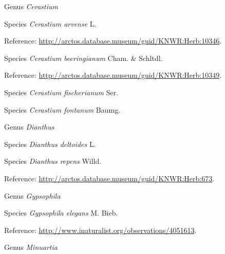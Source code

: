 \documentclass[9pt, article]{memoir}
\begin{document}
\begin{multicols}{2}
\vspace{6pt}\noindent\hspace{30pt}Genus \textit{Cerastium}


\vspace{6pt}\noindent\hspace{36pt}Species \textit{Cerastium arvense} L.


\vspace{6pt}Reference: 
\url{http://arctos.database.museum/guid/KNWR:Herb:10346}.

\vspace{6pt}\noindent\hspace{36pt}Species \textit{Cerastium beeringianum} Cham. \& Schltdl.


\vspace{6pt}Reference: 
\url{http://arctos.database.museum/guid/KNWR:Herb:10349}.

\vspace{6pt}\noindent\hspace{36pt}Species \textit{Cerastium fischerianum} Ser.


\vspace{6pt}\noindent\hspace{36pt}Species \textit{Cerastium fontanum} Baumg.


\vspace{6pt}\noindent\hspace{30pt}Genus \textit{Dianthus}


\vspace{6pt}\noindent\hspace{36pt}Species \textit{Dianthus deltoides} L.


\vspace{6pt}\noindent\hspace{36pt}Species \textit{Dianthus repens} Willd.


\vspace{6pt}Reference: 
\url{http://arctos.database.museum/guid/KNWR:Herb:673}.

\vspace{6pt}\noindent\hspace{30pt}Genus \textit{Gypsophila}


\vspace{6pt}\noindent\hspace{36pt}Species \textit{Gypsophila elegans} M. Bieb.


\vspace{6pt}Reference: 
\url{http://www.inaturalist.org/observations/4051613}.

\vspace{6pt}\noindent\hspace{30pt}Genus \textit{Minuartia}



\end{multicols}
\end{document}
